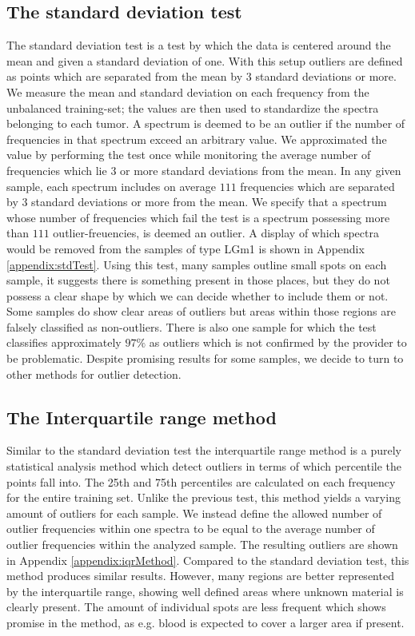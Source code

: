 \subsection{The standard deviation test}

The standard deviation test is a test by which the data is centered around the mean and given a standard deviation of one. With this setup outliers are defined as points which are separated from the mean by 3 standard deviations or more. We measure the mean and standard deviation on each frequency from the unbalanced training-set; the values are then used to standardize the spectra belonging to each tumor. A spectrum is deemed to be an outlier if the number of frequencies in that spectrum exceed an arbitrary value. We approximated the value by performing the test once while monitoring the average number of frequencies which lie $3$ or more standard deviations from the mean. In any given sample, each spectrum includes on average $111$ frequencies which are separated by 3 standard deviations or more from the mean. We specify that a spectrum whose number of frequencies which fail the test is a spectrum possessing more than $111$ outlier-freuencies, is deemed an outlier. A display of which spectra would be removed from the samples of type LGm1 is shown in Appendix \ref{appendix:stdTest}. Using this test, many samples outline small spots on each sample, it suggests there is something present in those places, but they do not possess a clear shape by which we can decide whether to include them or not. Some samples do show clear areas of outliers but areas within those regions are falsely classified as non-outliers. There is also one sample for which the test classifies approximately $97 \%$ as outliers which is not confirmed by the provider to be problematic. Despite promising results for some samples, we decide to turn to other methods for outlier detection.

\subsection{The Interquartile range method}

Similar to the standard deviation test the interquartile range method is a purely statistical analysis method which detect outliers in terms of which percentile the points fall into. The 25th and 75th percentiles are calculated on each frequency for the entire training set. Unlike the previous test, this method yields a varying amount of outliers for each sample. We instead define the allowed number of outlier frequencies within one spectra to be equal to the average number of outlier frequencies within the analyzed sample. The resulting outliers are shown in Appendix \ref{appendix:iqrMethod}. Compared to the standard deviation test, this method produces similar results. However, many regions are better represented by the interquartile range, showing well defined areas where unknown material is clearly present. The amount of individual spots are less frequent which shows promise in the method, as e.g. blood is expected to cover a larger area if present.

